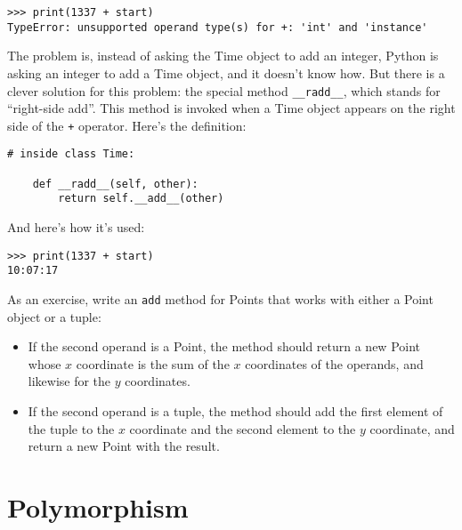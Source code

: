 \begin{lstlisting}
>>> print(1337 + start)
TypeError: unsupported operand type(s) for +: 'int' and 'instance'
\end{lstlisting}

%
The problem is, instead of asking the Time object to add an integer,
Python is asking an integer to add a Time object, and it doesn't know
how.  But there is a clever solution for this problem: the
special method \verb"__radd__", which stands for ``right-side add''.
This method is invoked when a Time object appears on the right side of
the {\tt +} operator.  Here's the definition:

\begin{lstlisting}
# inside class Time:

    def __radd__(self, other):
        return self.__add__(other)
\end{lstlisting}

%
And here's how it's used:

\begin{lstlisting}
>>> print(1337 + start)
10:07:17
\end{lstlisting}

%

As an exercise, write an {\tt add} method for Points that works with
either a Point object or a tuple:

\begin{itemize}

\item If the second operand is a Point, the method should return a new
Point whose $x$ coordinate is the sum of the $x$ coordinates of the
operands, and likewise for the $y$ coordinates.

\item If the second operand is a tuple, the method should add the
first element of the tuple to the $x$ coordinate and the second
element to the $y$ coordinate, and return a new Point with the result.

\end{itemize}




\section{Polymorphism}
\label{polymorphism}

